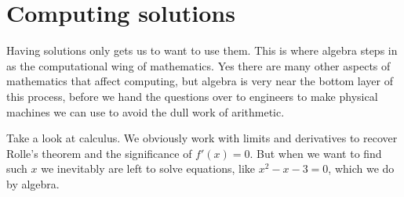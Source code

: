 \section{Computing solutions}
Having solutions only gets us to want to use them.  This is where 
algebra steps in as the computational wing of mathematics.  Yes there 
are many other aspects of mathematics that affect computing, but algebra 
is very near the bottom layer of this process, before we hand the questions 
over to engineers to make physical machines we can use to avoid the dull work
of arithmetic.

Take a look at calculus.
We obviously work with limits and derivatives to recover Rolle's theorem 
and the significance of $f'(x)=0$.  But when we want to find such $x$ we
inevitably are left to solve equations, like $x^2-x-3=0$, which we do by algebra.  

